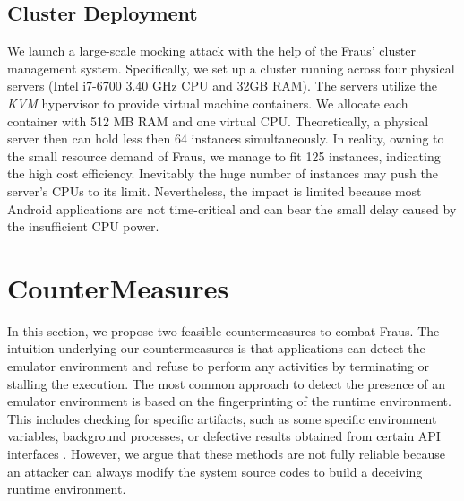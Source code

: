 \documentclass[conference]{IEEEtranl}
\begin{document}
	\subsection{Cluster Deployment}
	We launch a large-scale mocking attack with the help of the Fraus' cluster management system. Specifically, we set up a cluster running across four physical servers (Intel i7-6700 3.40 GHz CPU and 32GB RAM). The servers utilize the \textit{KVM} hypervisor to provide virtual machine containers. 
	We allocate each container with 512 MB RAM and one virtual CPU. Theoretically, a physical server then can hold less then 64 instances simultaneously. In reality, owning to the small resource demand of Fraus, we manage to fit 125 instances, indicating the high cost efficiency. 
	Inevitably the huge number of instances may push the server's CPUs to its limit. Nevertheless, the impact is limited because most Android applications are not time-critical and can bear the small delay caused by the insufficient CPU power.



	\section{CounterMeasures}\label{countermeasure}
	In this section, we propose two feasible countermeasures to combat Fraus. 
	The intuition underlying our countermeasures is that applications can detect the emulator environment and refuse to perform any activities by terminating or stalling the execution. The most common approach to detect
	the presence of an emulator environment is based on the fingerprinting of the runtime environment. This includes checking for specific artifacts, such as some specific environment variables, background processes, or defective results obtained from certain API interfaces \cite{vidas2014evading}. However, we argue that these methods are not fully reliable because an attacker can always modify the system source codes to build a deceiving runtime environment.
\end{document}
